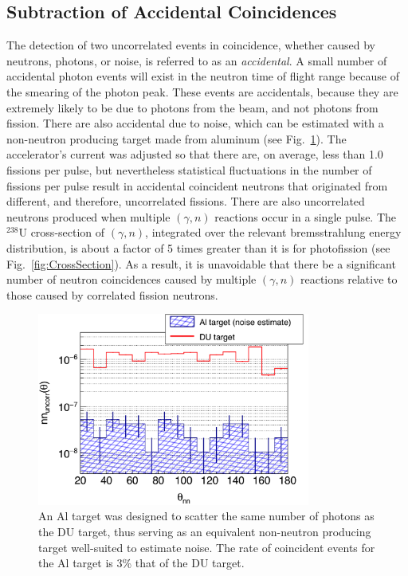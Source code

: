 \subsection{Subtraction of Accidental Coincidences}
\label{Reconstruction of Accidental Coincidence}
The detection of two uncorrelated events in coincidence, whether caused by neutrons, photons, or noise, is referred to as an \emph{accidental}.
A small number of accidental photon events will exist in the neutron time of flight range because of the smearing of the photon peak.
These events are accidentals, because they are extremely likely to be due to photons from the beam, and not photons from fission.
There are also accidental due to noise, which can be estimated with a non-neutron producing target made from aluminum (see Fig.~\ref{fig:Noise}).
The accelerator's current was adjusted so that there are, on average, less than 1.0 fissions per pulse, but nevertheless statistical fluctuations in the number of fissions per pulse result in accidental coincident neutrons that originated from different, and therefore, uncorrelated fissions.
There are also uncorrelated neutrons produced when multiple $(\gamma, n)$ reactions occur in a single pulse.
The $^{238}$U cross-section of $(\gamma, n)$, integrated over the relevant bremsstrahlung energy distribution, is about a factor of 5 times greater than it is for photofission (see Fig.~\ref{fig:CrossSection}).
As a result, it is unavoidable that there be a significant number of neutron coincidences caused by multiple $(\gamma, n)$ reactions relative to those caused by correlated fission neutrons.
\begin{figure}[]
\centering
    \includegraphics[width=0.8\textwidth]{Content/Methods/Noise.png}
    \caption{An Al target was designed to scatter the same number of photons as the DU target, thus serving as an equivalent non-neutron producing target well-suited to estimate noise.
    The rate of coincident events for the Al target is 3\% that of the DU target. 
        }
    \label{fig:Noise}
\end{figure}

